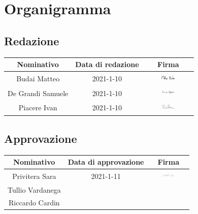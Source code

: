 \section{Organigramma}
\subsection{Redazione}
\begin{table}[H]
	\centering
	\renewcommand{\arraystretch}{1.5}
	\begin{tabular}{|c|c|c|}
		\hline
		\rowcolor{lighter-grayer}
		Nominativo & Data di redazione & Firma \\
		\hline
		Budai Matteo & 2021-1-10 & \includegraphics[width=0.3\textwidth, height=5mm]{res/images/firma3} \\
		\hline
		De Grandi Samuele & 2021-1-10 &  \includegraphics[width=0.3\textwidth, height=5mm]{res/images/firma4}\\
		\hline
		Piacere Ivan & 2021-1-10 & \includegraphics[width=0.3\textwidth, height=5mm]{res/images/firma5} \\
		\hline
	\end{tabular}
\end{table}

\subsection{Approvazione}
\begin{table}[H]
	\centering
	\renewcommand{\arraystretch}{1.5}
	\begin{tabular}{|c|c|c|}
		\hline
		\rowcolor{lighter-grayer}
		Nominativo & Data di approvazione & Firma \\
		\hline
		Privitera Sara & 2021-1-11 & \includegraphics[width=0.3\textwidth, height=5mm]{res/images/firma6}\\
		\hline
		Tullio Vardanega & & \\
		\hline
		Riccardo Cardin & & \\
		\hline
	\end{tabular}
\end{table}
